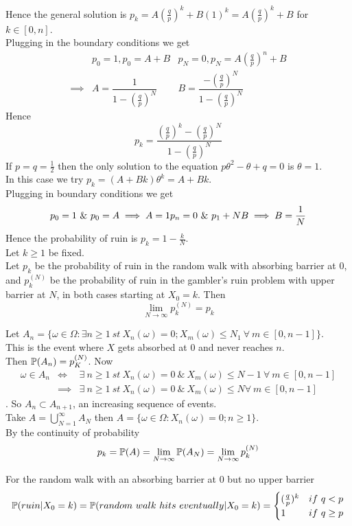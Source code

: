 \documentclass[11pt,a4paper]{article}
\begin{document}
Hence the general solution is $p_k=A(\frac{q}{p})^k +B(1)^k=A(\frac{q}{p})^k+B$ for $k\in[0,n]$.\\
Plugging in the boundary conditions we get
\[\begin{array}{rll}
&p_0=1,p_0=A+B&p_N=0,p_N=A(\frac{q}{p})^n+B\\
\implies&A=\dfrac{1}{1-(\frac{q}{p})^N}&B=\dfrac{-(\frac{q}{p})^N}{1-(\frac{q}{p})^N}
\end{array}\]
Hence $$p_k=\dfrac{(\frac{q}{p})^k-(\frac{q}{p})^N}{1-(\frac{q}{p})^N}$$
If $p=q=\frac{1}{2}$ then the only solution to the equation $p\theta^2-\theta+q=0$ is $\theta=1$.\\
In this case we try $p_k=(A+Bk)\theta^k=A+Bk$.\\
Plugging in boundary conditions we get
\[
p_0=1\ \&\ p_0=A\implies A=1\\
p_n=0\ \&\ p_1+NB\implies B=\frac{1}{N}
\]
Hence the probability of ruin is $p_k=1-\frac{k}{N}$.\\

Let $k\geq1$ be fixed.\\
Let $p_k$ be the probability of ruin in the random walk with absorbing barrier at $0$, and $p_k^{(N)}$ be the probability of ruin in the gambler's ruin problem with upper barrier at $N$, in both cases starting at $X_0=k$. Then
$$\lim_{N\to\infty}p_{k}^{(N)}=p_k$$

Let $A_n=\{\omega\in\Omega:\exists n\geq 1\ st\ X_n(\omega)=0; X_m(\omega)\leq N_1\ \forall\ m\in[0,n-1]\}$.\\
This is the event where $X$ gets absorbed at $0$ and never reaches $n$.\\
Then $\mathbb{P}(A_n)=p_K^{(N)}$. Now
\[\begin{array}{rcl}
\omega\in A_n&\Longleftrightarrow&\exists\ n\geq1\ st\ X_n(\omega)=0\ \&\ X_m(\omega)\leq N-1\ \forall\ m\in[0,n-1]\\
&\implies&\exists\ n\geq 1\ st\ X_n(\omega)=0\ \&\ X_m(\omega)\leq N\forall\ m\in[0,n-1]
\end{array}\].
So $A_n\subset A_{n+1}$, an increasing sequence of events.\\
Take $A=\bigcup_{N=1}^\infty A_N$ then $A=\{\omega\in\Omega:X_n(\omega)=0; n\geq1\}$.\\
By the continuity of probability
$$p_k=\mathbb{P}(A)=\lim_{N\to\infty}\mathbb{P}(A_N)=\lim_{N\to\infty}p_k^{(N)}$$

\theorem{}
For the random walk with an absorbing barrier at 0 but no upper barrier
$$\prob(ruin|X_0=k)=\prob(random\ walk\ hits\ eventually|X_0=k)=\begin{cases}(\frac{q}{p})^k& if\ q<p\\1&if\ q\geq p\end{cases}$$
\end{document}
